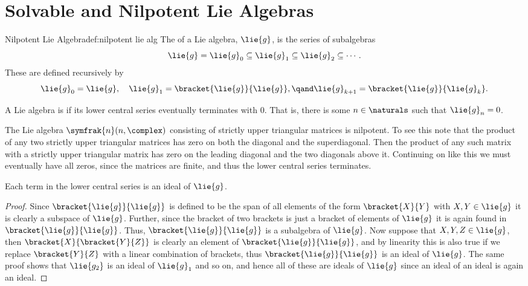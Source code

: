 \documentclass[fleqn]{NotesClass}
\newcommand{\nilpotentLie}{\symfrak{n}}
\begin{document}
    \section{Solvable and Nilpotent Lie Algebras}
    \begin{dfn}{Nilpotent Lie Algebra}{def:nilpotent lie alg}
        The  of a Lie algebra, \(\lie{g}\), is the series of subalgebras
        \begin{equation}
            \lie{g} = \lie{g}_0 \subseteq \lie{g}_1 \subseteq \lie{g}_2 \subseteq \dotsb.
        \end{equation}
        These are defined recursively by
        \begin{equation}
            \lie{g}_0 = \lie{g}, \quad \lie{g}_1 = \bracket{\lie{g}}{\lie{g}}, \qand \lie{g}_{k+1} = \bracket{\lie{g}}{\lie{g}_k}.
        \end{equation}
        
        A Lie algebra is  if its lower central series eventually terminates with \(0\).
        That is, there is some \(n \in \naturals\) such that \(\lie{g}_n = 0\).
    \end{dfn}
    
    \begin{exm}{}{}
        The Lie algebra \(\nilpotentLie(n, \complex)\) consisting of strictly upper triangular matrices is nilpotent.
        To see this note that the product of any two strictly upper triangular matrices has zero on both the diagonal and the superdiagonal.
        Then the product of any such matrix with a strictly upper triangular matrix has zero on the leading diagonal and the two diagonals above it.
        Continuing on like this we must eventually have all zeros, since the matrices are finite, and thus the lower central series terminates.
    \end{exm}
    
    \begin{lma}{}{}
        Each term in the lower central series is an ideal of \(\lie{g}\).
        \begin{proof}
            Since \(\bracket{\lie{g}}{\lie{g}}\) is defined to be the span of all elements of the form \(\bracket{X}{Y}\) with \(X, Y \in \lie{g}\) it is clearly a subspace of \(\lie{g}\).
            Further, since the bracket of two brackets is just a bracket of elements of \(\lie{g}\) it is again found in \(\bracket{\lie{g}}{\lie{g}}\).
            Thus, \(\bracket{\lie{g}}{\lie{g}}\) is a subalgebra of \(\lie{g}\).
            Now suppose that \(X, Y, Z \in \lie{g}\), then \(\bracket{X}{\bracket{Y}{Z}}\) is clearly an element of \(\bracket{\lie{g}}{\lie{g}}\), and by linearity this is also true if we replace \(\bracket{Y}{Z}\) with a linear combination of brackets, thus \(\bracket{\lie{g}}{\lie{g}}\) is an ideal of \(\lie{g}\).
            The same proof shows that \(\lie{g_2}\) is an ideal of \(\lie{g}_1\) and so on, and hence all of these are ideals of \(\lie{g}\) since an ideal of an ideal is again an ideal.
        \end{proof}
    \end{lma}
    
\end{document}
